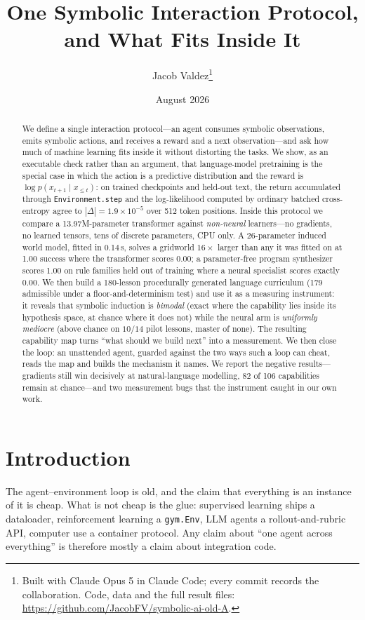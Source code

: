 \documentclass[11pt]{article}
\title{\bf One Symbolic Interaction Protocol,\\ and What Fits Inside It}
\author{Jacob Valdez\thanks{Built with Claude Opus 5 in Claude Code; every
commit records the collaboration. Code, data and the full result files:
\url{https://github.com/JacobFV/symbolic-ai-old-A}.}}
\date{August 2026}
\newcommand{\code}[1]{\texttt{\small #1}}
\begin{document}
\maketitle

\begin{abstract}
\noindent
We define a single interaction protocol---an agent consumes symbolic
observations, emits symbolic actions, and receives a reward and a next
observation---and ask how much of machine learning fits inside it without
distorting the tasks. We show, as an executable check rather than an argument,
that language-model pretraining is the special case in which the action is a
predictive distribution and the reward is $\log p(x_{t+1}\mid x_{\le t})$: on
trained checkpoints and held-out text, the return accumulated through
\code{Environment.step} and the log-likelihood computed by ordinary batched
cross-entropy agree to $|\Delta| = 1.9\times10^{-5}$ over 512 token positions.
Inside this protocol we compare a 13.97M-parameter transformer against
\emph{non-neural} learners---no gradients, no learned tensors, tens of discrete
parameters, CPU only. A 26-parameter induced world model, fitted in 0.14\,s,
solves a gridworld $16\times$ larger than any it was fitted on at 1.00 success
where the transformer scores 0.00; a parameter-free program synthesizer scores
1.00 on rule families held out of training where a neural specialist scores
exactly 0.00. We then build a 180-lesson procedurally generated language
curriculum (179 admissible under a floor-and-determinism test) and use it as a
measuring instrument: it reveals that symbolic induction is \emph{bimodal}
(exact where the capability lies inside its hypothesis space, at chance where it
does not) while the neural arm is \emph{uniformly mediocre} (above chance on
$10/14$ pilot lessons, master of none). The resulting capability map turns ``what
should we build next'' into a measurement. We then close the loop: an unattended
agent, guarded against the two ways such a loop can cheat, reads the map and
builds the mechanism it names. We report the negative results---gradients
still win decisively at natural-language modelling, 82 of 106 capabilities remain
at chance---and two measurement bugs that the instrument caught in our own work.
\end{abstract}

\section{Introduction}

The agent--environment loop is old, and the claim that everything is an instance
of it is cheap. What is not cheap is the glue: supervised learning ships a
dataloader, reinforcement learning a \code{gym.Env}, LLM agents a
rollout-and-rubric API, computer use a container protocol. Any claim about ``one
agent across everything'' is therefore mostly a claim about integration code.
\end{document}
